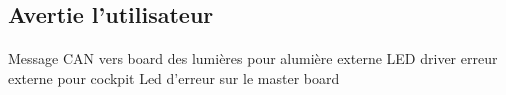 
\subsection{Avertie l'utilisateur}

	\paragraph*{}
	Message CAN vers board des lumières pour alumière externe
	LED driver erreur externe pour cockpit
	Led d'erreur sur le master board